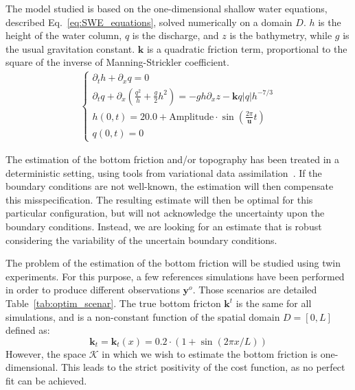 \documentclass[npg, manuscript]{copernicus}
\begin{document}
The model studied is based on the one-dimensional shallow water equations, described Eq.~\eqref{eq:SWE_equations}, solved numerically on a domain $D$. $h$ is the height of the water column, $q$ is the discharge, and $z$ is the bathymetry, while $g$ is the usual gravitation constant. $\mathbf{k}$ is a quadratic friction term, proportional to the square of the inverse of Manning-Strickler coefficient.
\begin{align}
  \label{eq:SWE_equations}
  \left\{
    \begin{array}{l}
      \partial_t h + \partial_x q = 0 \\
      \partial_t q + \partial_x \left(\frac{q^2}{h} + \frac{g}{2}h^2\right) = - gh\partial_x z - \mathbf{k}q |q|h^{-7/3} \\
      h(0, t) = 20.0 + \mathrm{Amplitude} \cdot \sin \left(\frac{2\pi}{\mathbf{u}}t\right) \\
      q(0, t) = 0
      \end{array}
  \right.
\end{align}

The estimation of the bottom friction and/or topography has been treated in a deterministic setting, %
using tools from variational data assimilation~\cite[e.g.][]{das_estimation_1991,das_variational_1992,honnorat_identification_2010}.
If the boundary conditions are not well-known, the estimation will then compensate this misspecification. The resulting estimate will then be optimal for this particular configuration, but will not acknowledge the uncertainty upon the boundary conditions. Instead, we are looking for an estimate that is robust considering the variability of the uncertain boundary conditions.


The problem of the estimation of the bottom friction will be studied using twin experiments. For this purpose, a few references simulations have been performed in order to produce different observations $\mathbf{y}^o$. Those scenarios are detailed Table~\ref{tab:optim_scenar}. The true bottom fricton $\mathbf{k}^t$ is the same for all simulations, and is a non-constant function of the spatial domain $D = [0, L]$ defined as:
\begin{equation}
  \label{eq:defnitio_kt}
  \mathbf{k}_t= \mathbf{k}_t(x) = 0.2\cdot (1 + \sin(2\pi x/L))
\end{equation}
However, the space $\mathcal{K}$ in which we wish to estimate the bottom friction is one-dimensional. This leads to the strict positivity of the cost function, as no perfect fit can be achieved.
\end{document}
